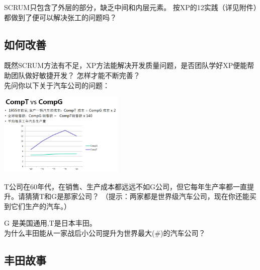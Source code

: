 SCRUM只包含了外层的部分，缺乏中间和内层元素。
按XP的12实践（详见附件）都做到了便可以解决张工的问题吗？\\

\hypertarget{ux5982ux4f55ux6539ux5584}{%
\subsection{如何改善}\label{ux5982ux4f55ux6539ux5584}}

既然SCRUM方法有不足，XP方法能解决开发质量问题，是否团队学好XP便能帮助团队做好敏捷开发？ 怎样才能不断完善？\\
先问你以下关于汽车公司的问题：


\includegraphics[width=6cm]{TvsGcompScreenshot_2023-06-07_121806-1.jpg}

T公司在60年代，在销售、生产成本都远远不如G公司，但它每年生产率都一直提升。请猜猜T和G是那家公司？
（提示：两家都是世界级汽车公司，现在你还能买到它们生产的汽车。）

\begin{description}
\item[]
\begin{description}
\tightlist
\item[]
= = = = = = = = = = = =
\end{description}
\end{description}

G 是美国通用,T是日本丰田。\\
为什么丰田能从一家战后小公司提升为世界最大(\#)的汽车公司？

\begin{description}
\item[]
\end{description}

\hypertarget{ux4e30ux7530ux6545ux4e8b}{%
\subsection{丰田故事}\label{ux4e30ux7530ux6545ux4e8b}}

